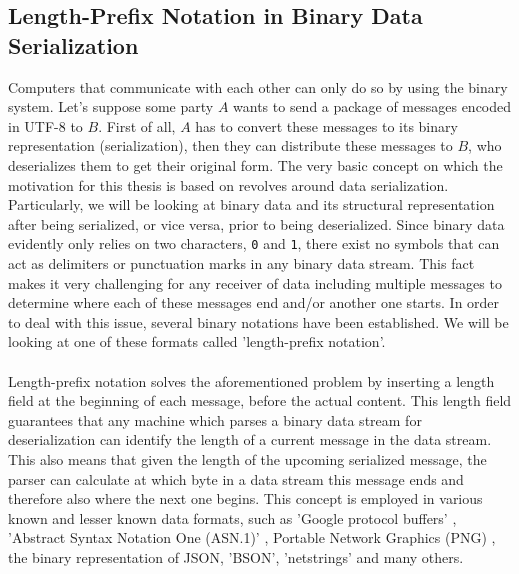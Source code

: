 \subsection{Length-Prefix Notation in Binary Data Serialization}
\label{1.2}
Computers that communicate with each other can only do so by using the binary system. Let's suppose some party $A$ wants to send a package of messages encoded in UTF-8 to $B$. First of all, $A$ has to convert these messages to its binary representation (serialization), then they can distribute these messages to $B$, who deserializes them to get their original form.
The very basic concept on which the motivation for this thesis is based on revolves around data serialization. Particularly, we will be looking at binary data and its structural representation after being serialized, or vice versa, prior to being deserialized.
Since binary data evidently only relies on two characters, \texttt{0} and \texttt{1}, there exist no symbols that can act as delimiters or punctuation marks in any binary data stream. This fact makes it very challenging for any receiver of data including multiple messages to determine where each of these messages end and/or another one starts. In order to deal with this issue, several binary notations have been established. We will be looking at one of these formats called 'length-prefix notation'. \\\\
Length-prefix notation solves the aforementioned problem by inserting a length field at the beginning of each message, before the actual content. This length field guarantees that any machine which parses a binary data stream for deserialization can identify the length of a current message in the data stream. This also means that given the length of the upcoming serialized message, the parser can calculate at which byte in a data stream this message ends and therefore also where the next one begins. This concept is employed in various known and lesser known data formats, such as 'Google protocol buffers' \cite{google-protobuf-overview}, 'Abstract Syntax Notation One (ASN.1)' \cite{ASN.1}, Portable Network Graphics (PNG) \cite{PNG}, the binary representation of JSON, 'BSON'\cite{BSON-overview}, 'netstrings' \cite{netstrings} and many others.

